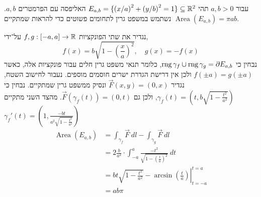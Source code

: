 \question{}
עבור $a, b > 0$ תהי $E_{a, b} = \{ {(x / a)}^2 + {(y / b)}^2 = 1 \} \subseteq \mathbb{R}^2$ האליפסה עם הפרמטרים $a, b$.
נשתמש במשפט גרין לתחומים פשוטים כדי להראות שמתקיים $\operatorname{Area}(E_{a, b}) = \pi a b$.
\begin{solution}
	נגדיר את שתי הפונקציות $f, g : [-a, a] \to \mathbb{R}$ על־ידי,
	\[
		f(x) = b \sqrt{1 - {\left(\frac{x}{a}\right)}^2},
		\quad
		g(x) = -f(x)
	\]
	נבחין כי $\operatorname{rng} \gamma_f \cup \operatorname{rng} \gamma_g = \partial E_{a, b}$, כלומר תנאי משפט גרין חלים עבור פונקציות אלה, כאשר $f(\pm a) = g(\pm a)$ ולכן אין דרישת הגדרת ישרים חוסמים מוספים.
	נעבור לחישוב השטח, נגדיר $\vec{F}(x, y) = (0, x)$ ונסיק ממשפט גרין שמתקיים.
	נבחין כי $\gamma_f(t) = (t, b \sqrt{1 - \frac{t^2}{a^2}})$,
	ולכן גם $\vec{F}(\gamma_f(t)) = (0, t)$.
	מהצד השני מתקיים $\gamma_f'(t) = (1, \frac{-b t}{a^2 \sqrt{1 - \frac{t^2}{a^2}}})$
	\begin{align*}
		\operatorname{Area}(E_{a, b})
		& = \int_{\gamma_f} \vec{F}\ dl - \int_{\gamma_g} \vec{F}\ dl \\
		& = 2 \frac{b}{a^2} \cdot \int_{-a}^{a} \frac{-t^2}{\sqrt{1 - {\left(\frac{t}{a}\right)}^2}}\ dt \\
		& = b {\left. t \sqrt{1 - \frac{t^2}{a^2}} - \arcsin\left(\frac{t}{a}\right) \right|}_{t = -a}^{t = a} \\
		& = ab \pi \\
	\end{align*}
\end{solution}


